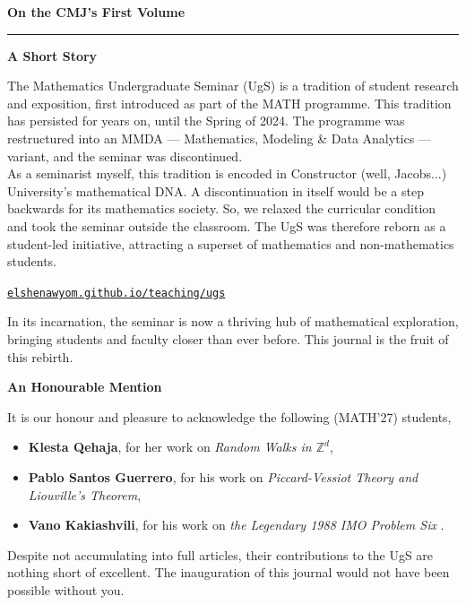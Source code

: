 \clearpage
\thispagestyle{frontmatter}

\vspace*{0.5cm}

\begin{center}
  {\LARGE\bfseries\color{cmjcrimson}On the CMJ's First Volume}\label{art:volume}
\end{center}

\vspace{0.3cm}
\noindent\textcolor{cmjgold}{\rule{\textwidth}{1.2pt}}
\vspace{0.3cm}


      {\large\bfseries\color{cmjcrimson}A Short Story}

      \vspace{0.3cm}

      The Mathematics Undergraduate Seminar (UgS) is a tradition of student research and exposition,
      first introduced as part of the MATH programme. This tradition has persisted for years on, 
      until the Spring of 2024. The programme was restructured into an MMDA --- Mathematics, Modeling \& Data Analytics --- variant,
      and the seminar was discontinued.\\[0.3cm]
      As a seminarist myself, this tradition is encoded in Constructor (well, Jacobs...) University's mathematical DNA. 
      A discontinuation in itself would be a step backwards for its mathematics society. So, we relaxed the curricular condition and took the
      seminar outside the classroom. The UgS was therefore reborn as a student-led initiative, attracting a superset of mathematics and non-mathematics students.
      \begin{center}
        \href{https://elshenawyom.github.io/teaching/ugs}{\texttt{elshenawyom.github.io/teaching/ugs}}
      \end{center}
      In its incarnation, the seminar is now a thriving hub of mathematical exploration, bringing students and faculty closer than ever before.  
      This journal is the fruit of this rebirth.

      \vspace{0.3cm}

      {\large\bfseries\color{cmjcrimson}An Honourable Mention}
  
      \vspace{0.3cm}

      It is our honour and pleasure to 
      acknowledge the following {\color{cmjgray}(MATH'27)} students,
      \begin{itemize}
        \item \textbf{Klesta Qehaja}, for her work on \emph{Random Walks in $\mathbb Z^d$},
        \item \textbf{Pablo Santos Guerrero}, for his work on \emph{Piccard-Vessiot Theory and Liouville's Theorem},
        \item \textbf{Vano Kakiashvili}, for his work on \emph{the Legendary 1988 IMO Problem Six} .
      \end{itemize}
      Despite not accumulating into full articles, their contributions 
      to the UgS are nothing short of excellent. 
      The inauguration of this journal would not have been possible without you. 

